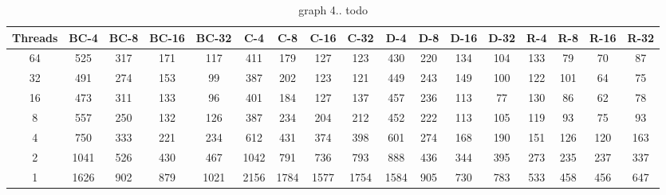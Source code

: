 \onecolumngrid
\begin{table}
{\scriptsize
\begin{tabular}{||c||c|c|c|c||c|c|c|c||c|c|c|c||c|c|c|c|}
\hline
\textbf{Threads}	&\cellcolor{black!10}BC-4&	\cellcolor{black!10}BC-8	&\cellcolor{black!10}BC-16	&\cellcolor{black!10}BC-32&	\cellcolor{black!10}C-4	&\cellcolor{black!10}C-8&	\cellcolor{black!10}C-16&	\cellcolor{black!10}C-32&	\cellcolor{black!10}D-4&	\cellcolor{black!10}D-8	&\cellcolor{black!10}D-16&\cellcolor{black!10}	D-32&	\cellcolor{black!10}R-4	&\cellcolor{black!10}R-8&	\cellcolor{black!10}R-16&	\cellcolor{black!10}R-32 \\ \hline \hline
64 &		525&	317	&171&	117	&411	&179&	127	&123	&430	&220	&134	&104&	133&	79&	70	&87	 \\ \hline		
32	&	491&	274	&153	&99	&387	&202	&123	&121 &449	&243&	149&	100	&122	&101&	64&	75\\ \hline
16	&	473	&311	&133	&96	&401	&184	&127	&137 &457	&236	&113	&77	&130	&86	&62	&78 \\ \hline
8	&	557&	250	&132	&126	&387	&234	&204	&212 &452	&222	&113	&105	&119&	93	&75	&93 \\ \hline
4		&750&	333	&221	&234	&612	&431	&374	&398 &601	&274 &168	&190	&151	&126&	120	&163 \\ \hline
2		&1041 &526 &430 &467	&1042	&791	&736	&793 &888	&436	&344	&395	&273	&235	&237	&337 \\ \hline
1		&1626&902&879 &1021 &2156 &1784 &1577 &1754 &1584 &905 &730 &783& 533 &458 &456 &647 \\ \hline
\end{tabular}
}
\label{tab:graph4}
\caption{graph 4.. todo}
\end{table}
\twocolumngrid


